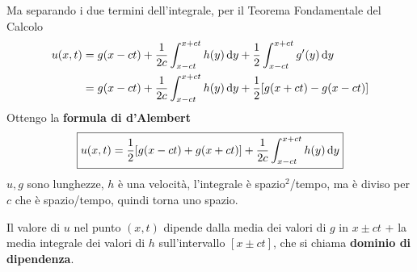 Ma separando i due termini dell'integrale, per il Teorema Fondamentale del Calcolo
\begin{align*}
    u(x,t) & =g(x-ct) +\frac{1}{2c}\int ^{x+ct}_{x-ct} h(y) \,\mathrm d y+\frac{1}{2}\int ^{x+ct}_{x-ct} g'(y) \,\mathrm d y \\
           & =g(x-ct) +\frac{1}{2c}\int ^{x+ct}_{x-ct} h(y) \,\mathrm d y+\frac{1}{2}[ g(x+ct) -g(x-ct)]
\end{align*}
Ottengo la \textbf{formula di d'Alembert}
\begin{equation}
    \boxed{u(x,t) =\frac{1}{2}[ g(x-ct) +g(x+ct)] +\frac{1}{2c}\int ^{x+ct}_{x-ct} h(y) \,\mathrm d y}
\end{equation}
$u,g$ sono lunghezze, $h$ è una velocità, l'integrale è spazio$^{2}$/tempo, ma è diviso per $c$ che è spazio/tempo, quindi torna uno spazio.

Il valore di $u$ nel punto $(x,t)$ dipende dalla media dei valori di $g$ in $x\pm ct$ + la media integrale dei valori di $h$ sull'intervallo $[ x\pm ct]$, che si chiama \textbf{dominio di dipendenza}.

